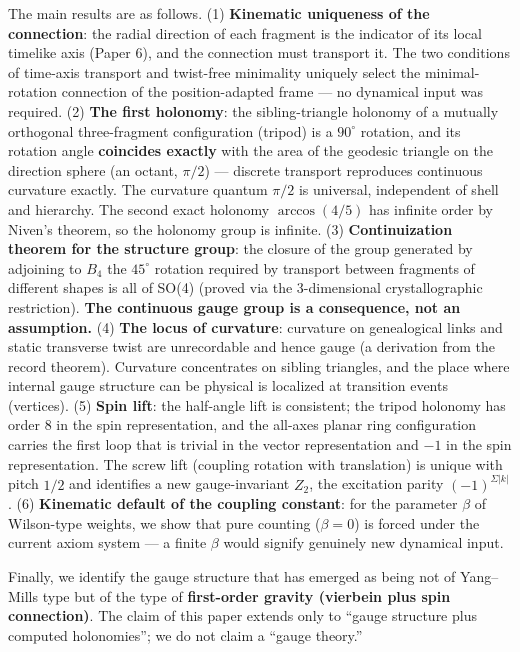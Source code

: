 \documentclass[
]{article}
\begin{document}
The main results are as follows. (1) \textbf{Kinematic uniqueness of the
connection}: the radial direction of each fragment is the indicator of
its local timelike axis (Paper 6), and the connection must transport it.
The two conditions of time-axis transport and twist-free minimality
uniquely select the minimal-rotation connection of the position-adapted
frame --- no dynamical input was required. (2) \textbf{The first
holonomy}: the sibling-triangle holonomy of a mutually orthogonal
three-fragment configuration (tripod) is a \(90^\circ\) rotation, and
its rotation angle \textbf{coincides exactly} with the area of the
geodesic triangle on the direction sphere (an octant, \(\pi/2\)) ---
discrete transport reproduces continuous curvature exactly. The
curvature quantum \(\pi/2\) is universal, independent of shell and
hierarchy. The second exact holonomy \(\arccos(4/5)\) has infinite order
by Niven's theorem, so the holonomy group is infinite. (3)
\textbf{Continuization theorem for the structure group}: the closure of
the group generated by adjoining to \(B_4\) the \(45^\circ\) rotation
required by transport between fragments of different shapes is all of
SO(4) (proved via the 3-dimensional crystallographic restriction).
\textbf{The continuous gauge group is a consequence, not an assumption.}
(4) \textbf{The locus of curvature}: curvature on genealogical links and
static transverse twist are unrecordable and hence gauge (a derivation
from the record theorem). Curvature concentrates on sibling triangles,
and the place where internal gauge structure can be physical is
localized at transition events (vertices). (5) \textbf{Spin lift}: the
half-angle lift is consistent; the tripod holonomy has order 8 in the
spin representation, and the all-axes planar ring configuration carries
the first loop that is trivial in the vector representation and \(-1\)
in the spin representation. The screw lift (coupling rotation with
translation) is unique with pitch \(1/2\) and identifies a new
gauge-invariant \(Z_2\), the excitation parity \((-1)^{\Sigma|k|}\). (6)
\textbf{Kinematic default of the coupling constant}: for the parameter
\(\beta\) of Wilson-type weights, we show that pure counting
(\(\beta=0\)) is forced under the current axiom system --- a finite
\(\beta\) would signify genuinely new dynamical input.

Finally, we identify the gauge structure that has emerged as being not
of Yang--Mills type but of the type of \textbf{first-order gravity
(vierbein plus spin connection)}. The claim of this paper extends only
to ``gauge structure plus computed holonomies''; we do not claim a
``gauge theory.''
\end{document}
